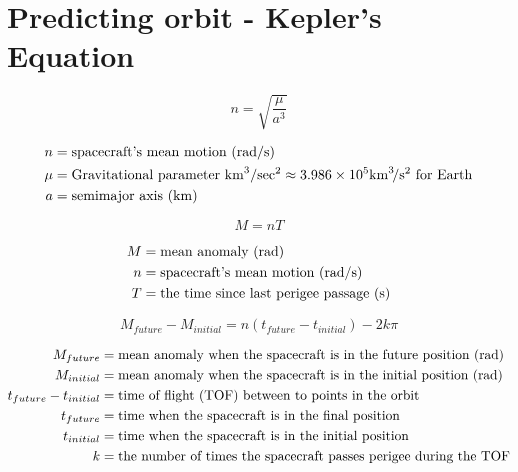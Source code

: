 \documentclass{article}
\newcommand{\myvarmukm}{\mu &= \text{Gravitational parameter \si{\kilo\meter\cubed\per\sec\squared}} \approx 3.986 \times 10^5 \si{\kilo\meter\cubed\per\second\squared} \text{ for Earth}}
\newcommand{\myvara}{a &= \text{semimajor axis (\si{\kilo\meter})}}
\begin{document}
\section{Predicting orbit - Kepler's Equation}

\begin{multicols}{3}
	\begin{equation*}
	n = \sqrt{\dfrac{\mu}{a^3}}
	\end{equation*}

	\vfill\null
	\columnbreak

	\begin{align*}
	n &= \text{spacecraft's mean motion (\si{\radian\per\second})}\\
	\myvarmukm\\
	\myvara\\
	\end{align*}
\end{multicols}

\begin{multicols}{3}
	\begin{equation*}
	M = nT
	\end{equation*}

	\vfill\null
	\columnbreak

	\begin{align*}
	M &= \text{mean anomaly (\si{\radian})}\\
	n &= \text{spacecraft's mean motion (\si{\radian\per\second})}\\
	T &= \text{the time since last perigee passage (\si{\second})}\\
	\end{align*}
\end{multicols}

\begin{equation*}
\boxed{M_{future} - M_{initial} = n(t_{future} - t_{initial}) - 2k\pi}
\end{equation*}

\begin{align*}
M_{future} &= \text{mean anomaly when the spacecraft is in the future position (\si{\radian})}\\
M_{initial} &= \text{mean anomaly when the spacecraft is in the initial position (\si{\radian})}\\
t_{future} - t_{initial} &= \text{time of flight (TOF) between to points in the orbit}\\
t_{future} &= \text{time when the spacecraft is in the final position}\\
t_{initial} &= \text{time when the spacecraft is in the initial position}\\
k &= \text{the number of times the spacecraft passes perigee during the TOF}\\
\end{align*}
\end{document}
